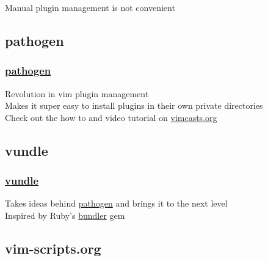 \documentclass[14pt,svgnames,compress]{beamer}
\begin{document}
\begin{frame}
    \begin{center}
        \LARGE
        Manual plugin management is not convenient \\
    \end{center}
\end{frame}


\subsection{pathogen}

\begin{frame}
    \frametitle{
        \href{https://github.com/tpope/vim-pathogen}
             {pathogen}
    }
    \large
    Revolution in vim plugin management \\
    \vspace{1.5em}
    Makes it super easy to install plugins in their own private directories \\
    \vspace{1.5em}
    Check out the how to and video tutorial on
    \href{http://vimcasts.org/episodes/synchronizing-plugins-with-git-submodules-and-pathogen/}
         {vimcasts.org} \\
\end{frame}


\subsection{vundle}

\begin{frame}
    \frametitle{
        \href{https://github.com/gmarik/vundle}
             {vundle}
    }
    \large
    Takes ideas behind \href{https://github.com/tpope/vim-pathogen}{pathogen}
    and brings it to the next level \\
    \vspace{1.5em}
    Inspired by Ruby's \href{http://github.com/wycats/bundler}{bundler} gem \\
\end{frame}


\subsection{vim-scripts.org}
\end{document}
